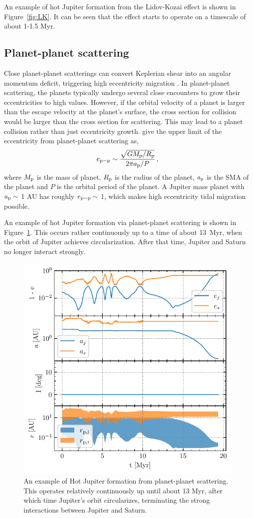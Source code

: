 \documentclass[twocolumn]{aastex63}
\begin{document}
An example of hot Jupiter formation from the Lidov-Kozai effect is shown in Figure~\ref{fig:LK}. It can be seen that the effect starts to operate on a timescale of about 1-1.5 Myr.


\subsection{Planet-planet scattering}

Close planet-planet scatterings can convert Keplerian shear into an angular momentum deficit, triggering high eccentricity migration \citep[e.g.][]{Rasio1996,Weidenschilling1996, Ford2006,Chatterjee2008}. In planet-planet scattering, the planets typically undergo several close encounters to grow their eccentricities to high values. However, if the orbital velocity of a planet is larger than the escape velocity at the planet's surface, the cross section for collision would be larger than the cross section for scattering. This may lead to a planet collision rather than just eccentricity growth. \citep{Goldreich2004,Ida2013,Petrovich2014} give the upper limit of the eccentricity from planet-planet scattering as,
\begin{equation}
e_{\rm p-p}\sim\frac{\sqrt{GM_{\rm p}/R_{\rm p }}}{2\pi a_{\rm p}/P}\,,
\end{equation}
where $M_{\rm p}$ is the mass of planet, $R_{\rm p}$ is the radius of the planet, $a_{\rm p}$ is the SMA of the planet and $P$ is the orbital period of the planet. A Jupiter mass planet with $a_{\rm p}\sim$ 1 AU has roughly $e_{\rm p-p}\sim$ 1, which makes high eccentricity tidal migration possible.

An example of hot Jupiter formation via planet-planet scattering is shown in Figure~\ref{fig:scattering}. 
This occurs rather continuously up to a time of about 13~Myr, when the orbit of Jupiter achieves circularization. After that time, Jupiter and Saturn no longer interact strongly.

\begin{figure}
    \includegraphics[width=.5\textwidth]{figs/example1.pdf}
    \caption{An example of Hot Jupiter formation from planet-planet scattering.  This operates relatively continuously up until about 13 Myr, after which time Jupiter's orbit circularizes, terminating the strong interactions between Jupiter and Saturn.}
    \label{fig:scattering}
\end{figure}
\end{document}
